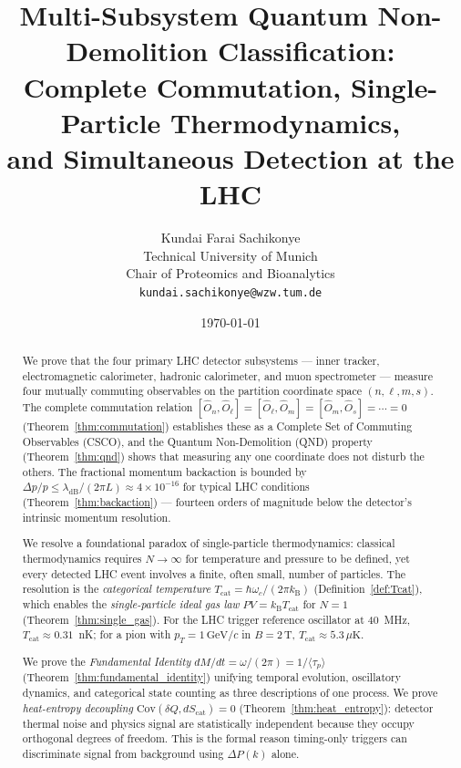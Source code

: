 \documentclass[twocolumn,10pt,a4paper]{article}
\title{\textbf{Multi-Subsystem Quantum Non-Demolition Classification:\\
Complete Commutation, Single-Particle Thermodynamics,\\
and Simultaneous Detection at the LHC}}
\author{
Kundai Farai Sachikonye\\
Technical University of Munich\\
Chair of Proteomics and Bioanalytics\\
\texttt{kundai.sachikonye@wzw.tum.de}
}
\date{\today}
\theoremstyle{thmstyle}
\theoremstyle{definition}
\theoremstyle{remark}
\newcommand{\kB}{k_{\mathrm{B}}}
\begin{document}
\maketitle

\begin{abstract}
\noindent
We prove that the four primary LHC detector subsystems — inner tracker,
electromagnetic calorimeter, hadronic calorimeter, and muon spectrometer —
measure four mutually commuting observables on the partition coordinate
space $(n, \ell, m, s)$. The complete commutation relation
$[\hat{O}_n, \hat{O}_\ell] = [\hat{O}_\ell, \hat{O}_m]
= [\hat{O}_m, \hat{O}_s] = \cdots = 0$
(Theorem~\ref{thm:commutation}) establishes these as a
Complete Set of Commuting Observables (CSCO), and the Quantum Non-Demolition
(QND) property (Theorem~\ref{thm:qnd}) shows that measuring any one
coordinate does not disturb the others. The fractional momentum backaction
is bounded by $\Delta p/p \leq \lambda_{\mathrm{dB}}/(2\pi L)
\approx 4 \times 10^{-16}$ for typical LHC conditions
(Theorem~\ref{thm:backaction}) — fourteen orders of magnitude below
the detector's intrinsic momentum resolution.

We resolve a foundational paradox of single-particle thermodynamics:
classical thermodynamics requires $N \to \infty$ for temperature and pressure
to be defined, yet every detected LHC event involves a finite, often small,
number of particles. The resolution is the \emph{categorical temperature}
$T_{\mathrm{cat}} = \hbar\omega_c/(2\pi\kB)$
(Definition~\ref{def:Tcat}), which enables the
\emph{single-particle ideal gas law} $PV = \kB T_{\mathrm{cat}}$ for $N = 1$
(Theorem~\ref{thm:single_gas}). For the LHC trigger reference oscillator at
40~MHz, $T_{\mathrm{cat}} \approx 0.31$~nK; for a pion with
$p_T = 1\,\mathrm{GeV}/c$ in $B = 2\,\mathrm{T}$,
$T_{\mathrm{cat}} \approx 5.3\,\mu\mathrm{K}$.

We prove the \emph{Fundamental Identity}
$dM/dt = \omega/(2\pi) = 1/\langle\tau_p\rangle$
(Theorem~\ref{thm:fundamental_identity}) unifying temporal evolution,
oscillatory dynamics, and categorical state counting as three descriptions
of one process. We prove \emph{heat-entropy decoupling}
$\mathrm{Cov}(\delta Q, dS_{\mathrm{cat}}) = 0$
(Theorem~\ref{thm:heat_entropy}): detector thermal noise and physics
signal are statistically independent because they occupy orthogonal
degrees of freedom. This is the formal reason timing-only triggers
can discriminate signal from background using $\Delta P(k)$ alone.


\end{abstract}
\end{document}
